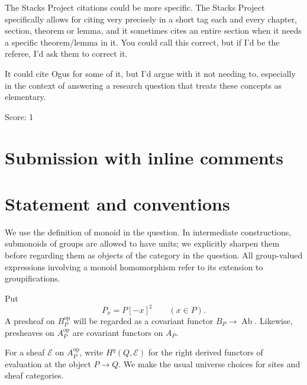\documentclass[11pt]{article}
\theoremstyle{definition}
\theoremstyle{remark}
\DeclareMathOperator{\Ab}{Ab}
\begin{document}
The Stacks Project citations could be more specific. The Stacks Project specifically allows for citing very precisely in a short tag each and every chapter, section, theorem or lemma, and it sometimes cites an entire section when it needs a specific theorem/lemma in it. You could call this correct, but if I'd be the referee, I'd ask them to correct it.

It could cite Ogus for some of it, but I'd argue with it not needing to, especially in the context of answering a research question that treats these concepts as elementary.

\noindent Score: 1

\newpage
\section{Submission with inline comments}


\begin{abstract}
The answer to the question is affirmative, without a finite-generation
hypothesis on the monoid. We prove a stronger statement: the presheaf
left Kan extension of the given presheaf is already a birhizomic sheaf
and is acyclic on every object of the birhizomic site. The proof uses
finite refinements of birhizomic covers, a finite convex-cover
calculation, and passage to filtered unions of finitely generated
saturated monoids.
\end{abstract}

\section{Statement and conventions}

We use the definition of monoid in the question. In intermediate
constructions, submonoids of groups are allowed to have units; we
explicitly sharpen them before regarding them as objects of the
category in the question. All group-valued expressions involving a
monoid homomorphism refer to its extension to groupifications.

Put
\[
P_x=P[-x]^\sharp\qquad(x\in P).
\]
A presheaf on \(B_P^{\mathrm{op}}\) will be regarded as a covariant
functor \(B_P\to\Ab\). Likewise, presheaves on \(A_P^{\mathrm{op}}\)
are covariant functors on \(A_P\).

For a sheaf \(\mathcal E\) on \(A_P^{\mathrm{op}}\), write
\(H^q(Q,\mathcal E)\) for the right derived functors of evaluation at
the object \(P\to Q\). We make the usual universe choices for sites
and sheaf categories.
\end{document}
